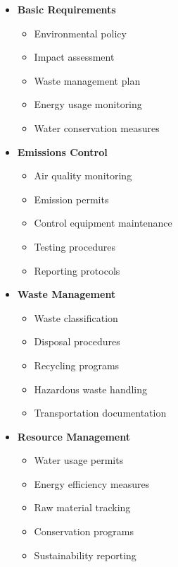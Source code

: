 \begin{tcolorbox}[
    colback=white,
    colframe=primarydark,
    title=\textbf{Environmental Protection Requirements},
    before skip=1em,
    after skip=1em
]
    \begin{itemize}[leftmargin=*,itemsep=0.5em]
        \item \textbf{Basic Requirements}
        \begin{itemize}[itemsep=0.3em]
            \item Environmental policy
            \item Impact assessment
            \item Waste management plan
            \item Energy usage monitoring
            \item Water conservation measures
        \end{itemize}

        \vspace{0.5em}

        \item \textbf{Emissions Control}
        \begin{itemize}[itemsep=0.3em]
            \item Air quality monitoring
            \item Emission permits
            \item Control equipment maintenance
            \item Testing procedures
            \item Reporting protocols
        \end{itemize}

        \vspace{0.5em}

        \item \textbf{Waste Management}
        \begin{itemize}[itemsep=0.3em]
            \item Waste classification
            \item Disposal procedures
            \item Recycling programs
            \item Hazardous waste handling
            \item Transportation documentation
        \end{itemize}

        \vspace{0.5em}

        \item \textbf{Resource Management}
        \begin{itemize}[itemsep=0.3em]
            \item Water usage permits
            \item Energy efficiency measures
            \item Raw material tracking
            \item Conservation programs
            \item Sustainability reporting
        \end{itemize}
    \end{itemize}
\end{tcolorbox}

